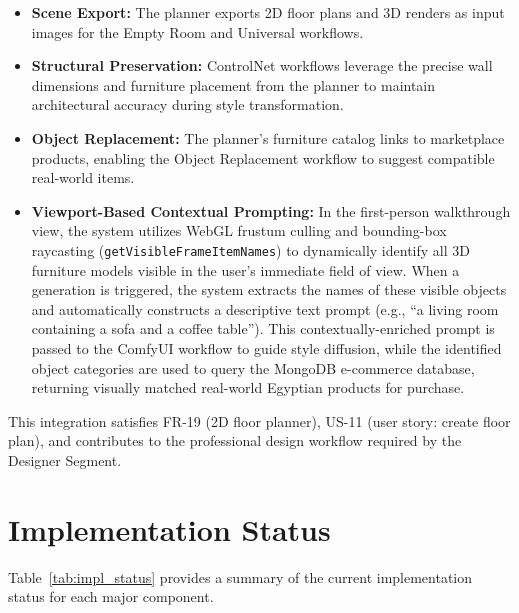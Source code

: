 \begin{itemize}
    \item \textbf{Scene Export:} The planner exports 2D floor plans and 3D renders as input images for the Empty Room and Universal workflows.
    
    \item \textbf{Structural Preservation:} ControlNet workflows leverage the precise wall dimensions and furniture placement from the planner to maintain architectural accuracy during style transformation.
    
    \item \textbf{Object Replacement:} The planner's furniture catalog links to marketplace products, enabling the Object Replacement workflow to suggest compatible real-world items.
    
    \item \textbf{Viewport-Based Contextual Prompting:} In the first-person walkthrough view, the system utilizes WebGL frustum culling and bounding-box raycasting (\texttt{getVisibleFrameItemNames}) to dynamically identify all 3D furniture models visible in the user's immediate field of view. When a generation is triggered, the system extracts the names of these visible objects and automatically constructs a descriptive text prompt (e.g., ``a living room containing a sofa and a coffee table''). This contextually-enriched prompt is passed to the ComfyUI workflow to guide style diffusion, while the identified object categories are used to query the MongoDB e-commerce database, returning visually matched real-world Egyptian products for purchase.
\end{itemize}

This integration satisfies FR-19 (2D floor planner), US-11 (user story: create floor plan), and contributes to the professional design workflow required by the Designer Segment.

\section{Implementation Status}
\label{sec:implementation_status}

Table~\ref{tab:impl_status} provides a summary of the current implementation status for each major component.

